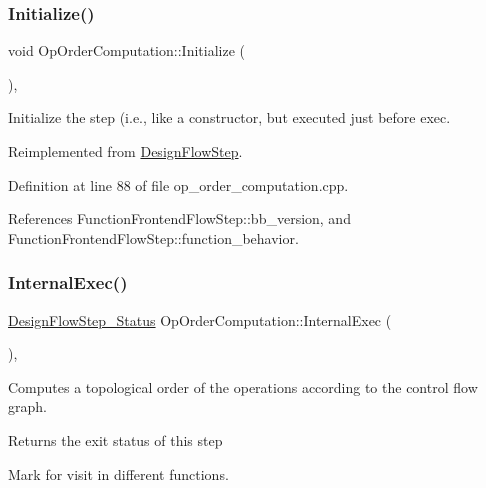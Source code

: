 \subsubsection{\texorpdfstring{Initialize()}{Initialize()}}
{\footnotesize\ttfamily void Op\+Order\+Computation\+::\+Initialize (\begin{DoxyParamCaption}{ }\end{DoxyParamCaption})\hspace{0.3cm}{\ttfamily [override]}, {\ttfamily [virtual]}}



Initialize the step (i.\+e., like a constructor, but executed just before exec. 



Reimplemented from \hyperlink{classDesignFlowStep_a44b50683382a094976e1d432a7784799}{Design\+Flow\+Step}.



Definition at line 88 of file op\+\_\+order\+\_\+computation.\+cpp.



References Function\+Frontend\+Flow\+Step\+::bb\+\_\+version, and Function\+Frontend\+Flow\+Step\+::function\+\_\+behavior.

\mbox{\label{classOpOrderComputation_a9d0944110ff2b9f699c1390db8f22650}} 
\subsubsection{\texorpdfstring{Internal\+Exec()}{InternalExec()}}
{\footnotesize\ttfamily \hyperlink{design__flow__step_8hpp_afb1f0d73069c26076b8d31dbc8ebecdf}{Design\+Flow\+Step\+\_\+\+Status} Op\+Order\+Computation\+::\+Internal\+Exec (\begin{DoxyParamCaption}{ }\end{DoxyParamCaption})\hspace{0.3cm}{\ttfamily [override]}, {\ttfamily [virtual]}}



Computes a topological order of the operations according to the control flow graph. 

\begin{DoxyReturn}{Returns}
the exit status of this step 
\end{DoxyReturn}
Mark for visit in different functions.

